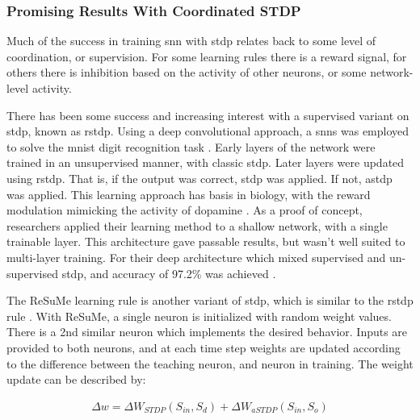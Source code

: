 \documentclass[conference]{IEEEtran}
\newcommand{\afig}[3]{
	\begin{figure}[H]
    	\centering
		\texttt{[image: \#1]}
        \caption{#2.}
        \label{#3}
	\end{figure}
}
\newcommand{\asvgf}[4]{
	\begin{figure}[!htbp]
    	\centering
		\adjustbox{max width=#4\linewidth}{}
        \caption{#2.}
        \label{#3}
	\end{figure}
}
\begin{document}
\subsubsection{Promising Results With Coordinated STDP}
Much of the success in training \gls{snn} with \gls{stdp} relates back to some
level of coordination, or supervision. For some learning rules there is a reward
signal, for others there is inhibition based on the activity of other neurons,
or some network-level activity.


There has been some success and increasing interest with a supervised variant on
\gls{stdp}, known as \gls{rstdp}. Using a deep convolutional approach, a
\glspl{snn} was employed to solve the \gls{mnist} digit recognition task
\parencite{mozafari_2018}. Early layers of the network were trained in an
unsupervised manner, with classic \gls{stdp}. Later layers were updated using
\gls{rstdp}. That is, if the output was correct, \gls{stdp} was applied. If not,
\gls{astdp} was applied. This learning approach has basis in biology, with the
reward modulation mimicking the activity of dopamine \parencite{mozafari_2018}. As
a proof of concept, researchers applied their learning method to a shallow
network, with a single trainable layer. This architecture gave passable results,
but wasn't well suited to multi-layer training. For their deep architecture
which mixed supervised and un-supervised \gls{stdp}, and accuracy of 97.2\% was
achieved \parencite{mozafari_2018}.



The ReSuMe learning rule is another variant of \gls{stdp}, which is similar to
the \gls{rstdp} rule \parencite{ponulak_2010}. With ReSuMe, a single neuron is
initialized with random weight values. There is a 2nd similar neuron which
implements the desired behavior. Inputs are provided to both neurons, and at
each time step weights are updated according to the difference between the
teaching neuron, and neuron in training. The weight update can be described by:

\begin{align}
  \Delta w = \Delta W_{STDP}(S_{in}, S_{d}) + \Delta W_{aSTDP}(S_{in}, S_{o}) \label{eq:resume_stdp}
\end{align}
\end{document}
